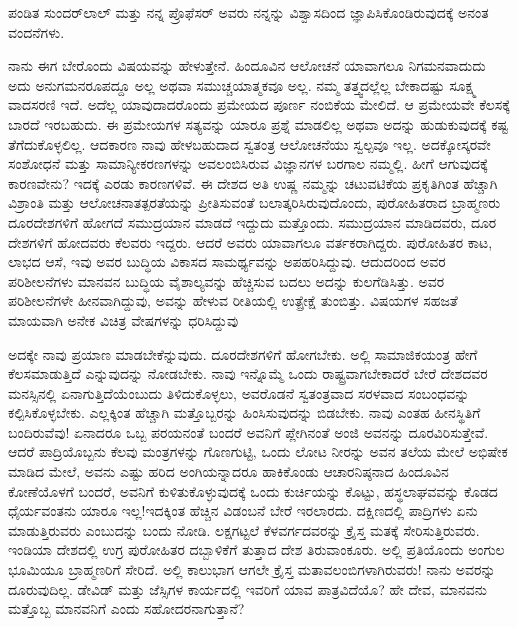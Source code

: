 ಪಂಡಿತ ಸುಂದರ್‌ಲಾಲ್ ಮತ್ತು ನನ್ನ ಪ್ರೊಫೆಸರ್ ಅವರು ನನ್ನನ್ನು ವಿಶ್ವಾಸದಿಂದ ಜ್ಞಾಪಿಸಿಕೊಂಡಿರುವುದಕ್ಕೆ ಅನಂತ ವಂದನೆಗಳು.

ನಾನು ಈಗ ಬೇರೊಂದು ವಿಷಯವನ್ನು ಹೇಳುತ್ತೇನೆ. ಹಿಂದೂವಿನ ಆಲೋಚನೆ ಯಾವಾಗಲೂ ನಿಗಮನವಾದುದು  ಅದು ಅನುಗಮನರೂಪದ್ದೂ  ಅಲ್ಲ ಅಥವಾ ಸಮುಚ್ಚಯಾತ್ಮಕವೂ  ಅಲ್ಲ. ನಮ್ಮ ತತ್ತ್ವದಲ್ಲೆಲ್ಲ ಬೇಕಾದಷ್ಟು ಸೂಕ್ಷ್ಮ ವಾದಸರಣಿ ಇದೆ. ಅದೆಲ್ಲ ಯಾವುದಾದರೊಂದು ಪ್ರಮೇಯದ  ಪೂರ್ಣ ನಂಬಿಕೆಯ ಮೇಲಿದೆ. ಆ ಪ್ರಮೇಯವೇ ಕೆಲಸಕ್ಕೆ ಬಾರದೆ ಇರಬಹುದು. ಈ ಪ್ರಮೇಯಗಳ ಸತ್ಯವನ್ನು ಯಾರೂ ಪ್ರಶ್ನೆ ಮಾಡಲಿಲ್ಲ ಅಥವಾ ಅದನ್ನು ಹುಡುಕುವುದಕ್ಕೆ ಕಷ್ಟ ತೆಗೆದುಕೊಳ್ಳಲಿಲ್ಲ. ಆದಕಾರಣ ನಾವು ಹೇಳಬಹುದಾದ ಸ್ವತಂತ್ರ ಆಲೋಚನೆಯು ಸ್ವಲ್ಪವೂ ಇಲ್ಲ. ಅದಕ್ಕೋಸ್ಕರವೇ ಸಂಶೋಧನೆ ಮತ್ತು ಸಾಮಾನ್ಯೀಕರಣಗಳನ್ನು ಅವಲಂಬಿಸಿರುವ ವಿಜ್ಞಾನಗಳ ಬರಗಾಲ ನಮ್ಮಲ್ಲಿ. ಹೀಗೆ ಆಗುವುದಕ್ಕೆ ಕಾರಣವೇನು? ಇದಕ್ಕೆ ಎರಡು ಕಾರಣಗಳಿವೆ. ಈ ದೇಶದ ಅತಿ ಉಷ್ಣ ನಮ್ಮನ್ನು ಚಟುವಟಿಕೆಯ ಪ್ರಕೃತಿಗಿಂತ ಹೆಚ್ಚಾಗಿ ವಿಶ್ರಾಂತಿ ಮತ್ತು ಆಲೋಚನಾತತ್ಪರತೆಯನ್ನು ಪ್ರೀತಿಸುವಂತೆ ಬಲಾತ್ಕರಿಸಿರುವುದೊಂದು, ಪುರೋಹಿತರಾದ ಬ್ರಾಹ್ಮಣರು ದೂರದೇಶಗಳಿಗೆ ಹೋಗದೆ ಸಮುದ್ರಯಾನ ಮಾಡದೆ ಇದ್ದುದು ಮತ್ತೊಂದು. ಸಮುದ್ರಯಾನ ಮಾಡಿದವರು, ದೂರ ದೇಶಗಳಿಗೆ ಹೋದವರು ಕೆಲವರು ಇದ್ದರು. ಆದರೆ ಅವರು ಯಾವಾಗಲೂ ವರ್ತಕರಾಗಿದ್ದರು. ಪುರೋಹಿತರ ಕಾಟ, ಲಾಭದ ಆಸೆ, ಇವು ಅವರ ಬುದ್ಧಿಯ ವಿಕಾಸದ ಸಾಮರ್ಥ್ಯವನ್ನು ಅಪಹರಿಸಿದ್ದುವು. ಆದುದರಿಂದ ಅವರ ಪರಿಶೀಲನೆಗಳು ಮಾನವನ ಬುದ್ಧಿಯ ವೈಶಾಲ್ಯವನ್ನು ಹೆಚ್ಚಿಸುವ ಬದಲು ಅದನ್ನು ಕುಲಗೆಡಿಸಿತ್ತು. ಅವರ ಪರಿಶೀಲನೆಗಳೇ ಹೀನವಾಗಿದ್ದುವು, ಅವನ್ನು ಹೇಳುವ ರೀತಿಯಲ್ಲಿ ಉತ್ಪ್ರೇಕ್ಷೆ ತುಂಬಿತ್ತು. ವಿಷಯಗಳ ಸಹಜತೆ ಮಾಯವಾಗಿ ಅನೇಕ ವಿಚಿತ್ರ ವೇಷಗಳನ್ನು ಧರಿಸಿದ್ದುವು

ಅದಕ್ಕೇ ನಾವು ಪ್ರಯಾಣ ಮಾಡಬೇಕೆನ್ನುವುದು. ದೂರದೇಶಗಳಿಗೆ ಹೋಗಬೇಕು. ಅಲ್ಲಿ ಸಾಮಾಜಿಕಯಂತ್ರ ಹೇಗೆ ಕೆಲಸಮಾಡುತ್ತಿದೆ ಎನ್ನುವುದನ್ನು ನೋಡಬೇಕು. ನಾವು ಇನ್ನೊಮ್ಮೆ ಒಂದು ರಾಷ್ಟ್ರವಾಗಬೇಕಾದರೆ ಬೇರೆ ದೇಶದವರ ಮನಸ್ಸಿನಲ್ಲಿ ಏನಾಗುತ್ತಿದೆಯೆಂಬುದು ತಿಳಿದುಕೊಳ್ಳಲು, ಅವರೊಡನೆ ಸ್ವತಂತ್ರವಾದ ಸರಳವಾದ ಸಂಬಂಧವನ್ನು ಕಲ್ಪಿಸಿಕೊಳ್ಳಬೇಕು. ಎಲ್ಲಕ್ಕಿಂತ ಹೆಚ್ಚಾಗಿ ಮತ್ತೊಬ್ಬರನ್ನು ಹಿಂಸಿಸುವುದನ್ನು ಬಿಡಬೇಕು. ನಾವು ಎಂತಹ ಹೀನಸ್ಥಿತಿಗೆ ಬಂದಿರುವೆವು! ಏನಾದರೂ ಒಬ್ಬ ಪರಯನಂತೆ ಬಂದರೆ ಅವನಿಗೆ ಪ್ಲೇಗಿನಂತೆ ಅಂಜಿ ಅವನನ್ನು ದೂರವಿರಿಸುತ್ತೇವೆ. ಆದರೆ ಪಾದ್ರಿಯೊಬ್ಬನು ಕೆಲವು ಮಂತ್ರಗಳನ್ನು ಗೊಣಗುಟ್ಟಿ, ಒಂದು ಲೋಟ ನೀರನ್ನು ಅವನ ತಲೆಯ ಮೇಲೆ ಅಭಿಷೇಕ ಮಾಡಿದ ಮೇಲೆ, ಅವನು ಎಷ್ಟು ಹರಿದ ಅಂಗಿಯನ್ನಾದರೂ ಹಾಕಿಕೊಂಡು ಆಚಾರನಿಷ್ಠನಾದ ಹಿಂದೂವಿನ ಕೋಣೆಯೊಳಗೆ ಬಂದರೆ, ಅವನಿಗೆ ಕುಳಿತುಕೊಳ್ಳುವುದಕ್ಕೆ ಒಂದು ಕುರ್ಚಿಯನ್ನು ಕೊಟ್ಟು, ಹಸ್ಥಲಾಘವವನ್ನು ಕೊಡದ ಧೈರ್ಯವಂತನು ಯಾರೂ ಇಲ್ಲ!ಇದಕ್ಕಿಂತ ಹೆಚ್ಚಿನ ವಿಡಂಬನೆ ಬೇರೆ ಇರಲಾರದು. ದಕ್ಷಿಣದಲ್ಲಿ ಪಾದ್ರಿಗಳು ಏನು ಮಾಡುತ್ತಿರುವರು ಎಂಬುದನ್ನು ಬಂದು ನೋಡಿ. ಲಕ್ಷಗಟ್ಟಲೆ ಕೆಳವರ್ಗದವರನ್ನು ಕ್ರೈಸ್ತ ಮತಕ್ಕೆ ಸೇರಿಸುತ್ತಿರುವರು. ಇಂಡಿಯಾ ದೇಶದಲ್ಲಿ ಉಗ್ರ ಪುರೋಹಿತರ ದಬ್ಬಾಳಿಕೆಗೆ ತುತ್ತಾದ ದೇಶ ತಿರುವಾಂಕೂರು. ಅಲ್ಲಿ ಪ್ರತಿಯೊಂದು ಅಂಗುಲ ಭೂಮಿಯೂ ಬ್ರಾಹ್ಮಣರಿಗೆ ಸೇರಿದೆ. ಅಲ್ಲಿ ಕಾಲುಭಾಗ ಆಗಲೇ ಕ್ರೈಸ್ತ ಮತಾವಲಂಬಿಗಳಾಗಿರುವರು! ನಾನು ಅವರನ್ನು ದೂರುವುದಿಲ್ಲ. ಡೇವಿಡ್ ಮತ್ತು ಜೆಸ್ಸಿಗಳ ಕಾರ್ಯದಲ್ಲಿ ಇವರಿಗೆ ಯಾವ ಪಾತ್ರವಿದೆಯೊ? ಹೇ ದೇವ, ಮಾನವನು ಮತ್ತೊಬ್ಬ ಮಾನವನಿಗೆ ಎಂದು ಸಹೋದರನಾಗುತ್ತಾನೆ?

